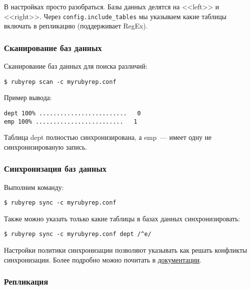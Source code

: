 В настройках просто разобраться. Базы данных делятся на <<left>> и <<right>>. Через \lstinline!config.include_tables! мы указываем какие таблицы включать в репликацию (поддерживает RegEx).

\subsubsection{Сканирование баз данных}

Сканирование баз данных для поиска различий:

\begin{lstlisting}[label=lst:rubyrep6,caption=Сканирование баз данных]
$ rubyrep scan -c myrubyrep.conf
\end{lstlisting}

Пример вывода:

\begin{lstlisting}[label=lst:rubyrep7,caption=Сканирование баз данных]
dept 100% .........................   0
emp 100% .........................   1
\end{lstlisting}

Таблица dept полностью синхронизирована, а emp~--- имеет одну не синхронизированую запись.

\subsubsection{Синхронизация баз данных}

Выполним команду:

\begin{lstlisting}[label=lst:rubyrep8,caption=Синхронизация баз данных]
$ rubyrep sync -c myrubyrep.conf
\end{lstlisting}

Также можно указать только какие таблицы в базах данных синхронизировать:
\begin{lstlisting}[label=lst:rubyrep9,caption=Синхронизация баз данных]
$ rubyrep sync -c myrubyrep.conf dept /^e/
\end{lstlisting}

Настройки политики синхронизации позволяют указывать как решать конфликты синхронизации. Более подробно можно почитать в \href{http://www.rubyrep.org/configuration.html}{документации}.

\subsubsection{Репликация}

